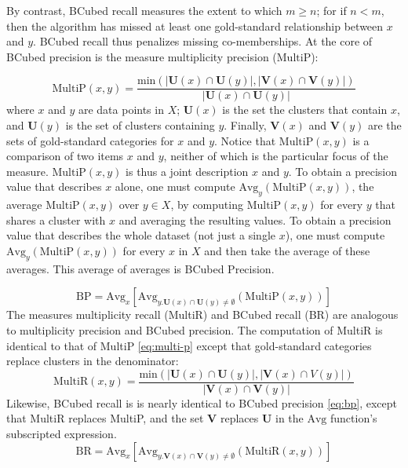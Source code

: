 By contrast, BCubed recall measures the extent to which $m \geq n$; for if $n<m$, then the algorithm 
has missed at least one gold-standard relationship between $x$ and $y$. BCubed recall thus 
penalizes missing co-memberships. %
At the core of BCubed precision is the measure multiplicity precision ($\text{MultiP}$):

\begin{equation}\label{eq:multi-p}
\text{MultiP}(x,y) = \frac{\text{min}(|\mathbf{U}(x) \cap \mathbf{U}(y)|, |\mathbf{V}(x) \cap \mathbf{V}(y)|)}{|\mathbf{U}(x) \cap \mathbf{U}(y)|}
\end{equation}
where $x$ and $y$ are data points in $X$; $\mathbf{U}(x)$ is the set the clusters that contain $x$, 
and $\mathbf{U}(y)$ is the set of clusters containing $y$.
Finally, 
$\mathbf{V}(x)$ and $\mathbf{V}(y)$ are the sets of gold-standard categories for $x$ and $y$. 
Notice that $\text{MultiP}(x,y)$ is a comparison of two items $x$ and $y$, neither of which is the 
particular focus of the measure. $\text{MultiP}(x,y)$ is thus a joint description $x$ and $y$. 
To obtain a precision value that describes $x$ alone, one must compute $\text{Avg}_{y}(\text{MultiP} (x,y))$, the 
average $\text{MultiP}(x,y)$ over $y \in X$, by computing $\text{MultiP}(x,y)$ for every $y$ that shares a cluster with $x$ 
and averaging the resulting values. To obtain a precision value that describes the whole dataset (not just a single $x$), 
one must compute $\text{Avg}_y(\text{MultiP}(x,y))$ for every $x$ in $X$ and then take the average of these averages. 
This average of averages is BCubed Precision. 

\begin{equation}\label{eq:bp}
\text{BP}=\text{Avg}_x [\text{Avg}_{y.\mathbf{U}(x) \cap \mathbf{U}(y) \neq \emptyset}(\text{MultiP}(x,y))]
\end{equation}
The measures multiplicity recall (MultiR) and BCubed recall (BR) are analogous to multiplicity precision and
 BCubed precision. The computation of MultiR is identical to that of MultiP \eqref{eq:multi-p}
 except that gold-standard categories replace clusters in the denominator: 
\begin{equation}\label{eq:multi-r}
\text{MultiR}(x,y) = \frac{\text{min}(|\mathbf{U}(x) \cap \mathbf{U}(y)|, |\mathbf{V}(x) \cap V (y)|)}{|\mathbf{V}(x) \cap \mathbf{V}(y)|}
\end{equation}
Likewise, BCubed recall is is nearly identical to BCubed precision \eqref{eq:bp}, except that MultiR replaces MultiP, 
and the set $\mathbf{V}$ replaces $\mathbf{U}$ in the $\text{Avg}$ function's subscripted expression.
\begin{equation}\label{eq:br}
\textrm{BR} = \textrm{Avg}_x [\textrm{Avg}_{y.\mathbf{V}(x) \cap \mathbf{V}(y) \neq \emptyset}(\text{MultiR}(x,y))]
\end{equation}

